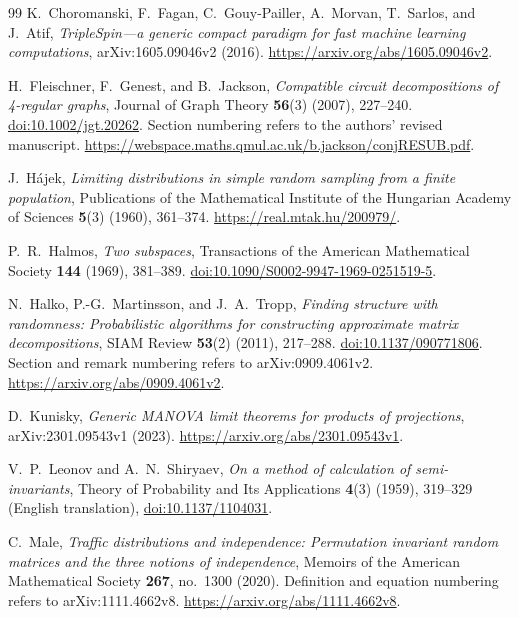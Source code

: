 \documentclass[11pt]{article}
\theoremstyle{definition}
\theoremstyle{remark}
\theoremstyle{plain}
\begin{document}
\begin{thebibliography}{99}
K.~Choromanski, F.~Fagan, C.~Gouy-Pailler, A.~Morvan,
T.~Sarlos, and J.~Atif,
\emph{TripleSpin---a generic compact paradigm for fast machine
learning computations}, arXiv:1605.09046v2 (2016).
\url{https://arxiv.org/abs/1605.09046v2}.

H.~Fleischner, F.~Genest, and B.~Jackson,
\emph{Compatible circuit decompositions of 4-regular graphs},
Journal of Graph Theory \textbf{56}(3) (2007), 227--240.
\href{https://doi.org/10.1002/jgt.20262}{doi:10.1002/jgt.20262}.
Section numbering refers to the authors' revised manuscript.
\url{https://webspace.maths.qmul.ac.uk/b.jackson/conjRESUB.pdf}.

J.~H\'ajek,
\emph{Limiting distributions in simple random sampling from a
finite population},
Publications of the Mathematical Institute of the Hungarian
Academy of Sciences \textbf{5}(3) (1960), 361--374.
\url{https://real.mtak.hu/200979/}.

P.~R.~Halmos,
\emph{Two subspaces},
Transactions of the American Mathematical Society \textbf{144}
(1969), 381--389.
\href{https://doi.org/10.1090/S0002-9947-1969-0251519-5}{doi:10.1090/S0002-9947-1969-0251519-5}.

N.~Halko, P.-G.~Martinsson, and J.~A.~Tropp,
\emph{Finding structure with randomness: Probabilistic algorithms
for constructing approximate matrix decompositions},
SIAM Review \textbf{53}(2) (2011), 217--288.
\href{https://doi.org/10.1137/090771806}{doi:10.1137/090771806}.
Section and remark numbering refers to arXiv:0909.4061v2.
\url{https://arxiv.org/abs/0909.4061v2}.

D.~Kunisky,
\emph{Generic MANOVA limit theorems for products of projections},
arXiv:2301.09543v1 (2023).
\url{https://arxiv.org/abs/2301.09543v1}.

V.~P.~Leonov and A.~N.~Shiryaev,
\emph{On a method of calculation of semi-invariants},
Theory of Probability and Its Applications
\textbf{4}(3) (1959), 319--329 (English translation),
\href{https://doi.org/10.1137/1104031}{doi:10.1137/1104031}.

C.~Male,
\emph{Traffic distributions and independence: Permutation invariant
random matrices and the three notions of independence},
Memoirs of the American Mathematical Society \textbf{267},
no.~1300 (2020).
Definition and equation numbering refers to arXiv:1111.4662v8.
\url{https://arxiv.org/abs/1111.4662v8}.


\end{thebibliography}
\end{document}

